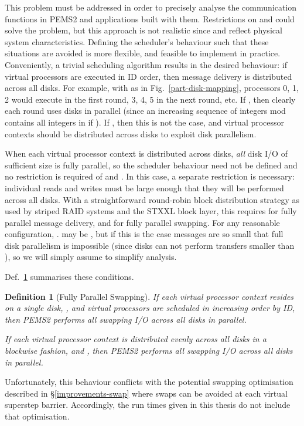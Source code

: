 \documentclass[12pt]{carletoncsthesis}
\newtheorem{definition}[thm]{Definition}
\begin{document}
This problem must be addressed in order to precisely analyse the communication
functions in PEMS2 and applications built with them.  Restrictions
on  and  could solve the problem, but this approach is not realistic
since  and  reflect physical system characteristics.  Defining the
scheduler's behaviour such that these situations are avoided is more flexible,
and feasible to implement in practice.  Conveniently, a trivial scheduling
algorithm results in the desired behaviour: if virtual processors are
executed in ID order, then message delivery is distributed across all disks.
For example, with  as in Fig.~\ref{part-disk-mapping}, processors 0, 1,
2 would execute in the first round, 3, 4, 5 in the next round, etc.  If , then clearly each round uses  disks in parallel (since an increasing
sequence of  integers mod  contains all integers in  if
).  If , then this is not the case, and virtual processor
contexts should be distributed across disks to exploit disk parallelism.

When each virtual processor context is distributed across disks, {\em all}
disk I/O of sufficient size is fully parallel, so the scheduler behaviour
need not be defined and no restriction is required of  and .  In this
case, a separate restriction is necessary: individual reads and writes must
be large enough that they will be performed across all  disks.  With a
straightforward round-robin block distribution strategy as used by striped RAID
systems and the STXXL block layer, this requires  for fully
parallel message delivery, and  for fully parallel swapping.
For any reasonable configuration, .   may be ,
but if this is the case messages are so small that full disk parallelism
is impossible (since disks can not perform transfers smaller than ),
so we will simply assume  to simplify analysis.

Def.~\ref{full-swap-par} summarises these conditions.

\begin{definition}[Fully Parallel Swapping]
If each virtual processor context resides on a single disk, ,
and virtual processors are scheduled in increasing order by ID, then PEMS2
performs all swapping I/O across all  disks in parallel.

If each virtual processor context is distributed evenly across all disks
in a blockwise fashion, and , then PEMS2 performs all swapping
I/O across all  disks in parallel.
\label{full-swap-par}
\end{definition}

Unfortunately, this behaviour conflicts with the potential swapping
optimisation described in \S\ref{improvements-swap} where  swaps can be
avoided at each virtual superstep barrier.  Accordingly, the run times given
in this thesis do not include that optimisation.
\end{document}
